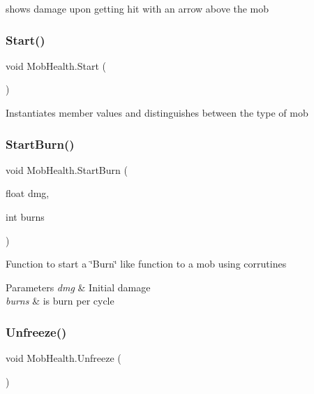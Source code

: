 shows damage upon getting hit with an arrow above the mob \mbox{\label{class_mob_health_af397aaaf764c7338aa1a83714537a68a}} 
\subsubsection{\texorpdfstring{Start()}{Start()}}
{\footnotesize\ttfamily void Mob\+Health.\+Start (\begin{DoxyParamCaption}{ }\end{DoxyParamCaption})\hspace{0.3cm}{\ttfamily [private]}}

Instantiates member values and distinguishes between the type of mob \mbox{\label{class_mob_health_abcc0a1a5fef542a2c5f83e3d80d21d18}} 
\subsubsection{\texorpdfstring{Start\+Burn()}{StartBurn()}}
{\footnotesize\ttfamily void Mob\+Health.\+Start\+Burn (\begin{DoxyParamCaption}\item[{float}]{dmg,  }\item[{int}]{burns }\end{DoxyParamCaption})}

Function to start a \char`\"{}\+Burn\char`\"{} like function to a mob using corrutines 
\begin{DoxyParams}{Parameters}
{\em dmg} & Initial damage \\
\hline
{\em burns} & is burn per cycle \\
\hline
\end{DoxyParams}
\mbox{\label{class_mob_health_aa6acd5f6aad4b4d621db7d927169cd70}} 
\subsubsection{\texorpdfstring{Unfreeze()}{Unfreeze()}}
{\footnotesize\ttfamily void Mob\+Health.\+Unfreeze (\begin{DoxyParamCaption}{ }\end{DoxyParamCaption})\hspace{0.3cm}{\ttfamily [private]}}

